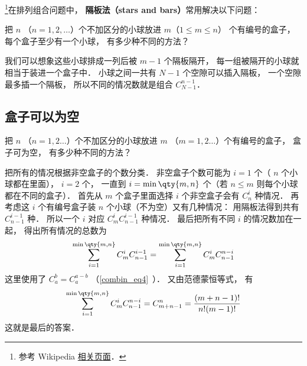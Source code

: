 

\footnote{参考 Wikipedia \href{https://en.wikipedia.org/wiki/Stars_and_bars_(combinatorics)}{相关页面}．}在排列组合问题中， \textbf{隔板法（stars and bars）}常用解决以下问题：

\begin{example}{}
把 $n$ （$n = 1,2,\dots$）个不加区分的小球放进 $m$（$1\leqslant m\leqslant n$） 个有编号的盒子， 每个盒子至少有一个小球， 有多少种不同的方法？
\end{example}

我们可以想象这些小球排成一列后被 $m-1$ 个隔板隔开， 每一组被隔开的小球就相当于装进一个盒子中． 小球之间一共有 $N-1$ 个空隙可以插入隔板， 一个空隙最多插一个隔板， 所以不同的情况数就是组合 $C_{N-1}^{n-1}$．

\subsection{盒子可以为空}

\begin{example}{}
把 $n$ （$n=1,2\dots$）个不加区分的小球放进 $m$ （$m=1,2\dots$）个有编号的盒子， 盒子可为空， 有多少种不同的方法？
\end{example}

把所有的情况根据非空盒子的个数分类． 非空盒子个数可能为 $i=1$ 个（ $n$ 个小球都在里面）， $i=2$ 个， 一直到 $i=\min\qty{m,n}$ 个（若 $n\leqslant m$ 则每个小球都在不同的盒子）． 首先从 $m$ 个盒子里面选择 $i$ 个非空盒子会有 $C_n^i$ 种情况． 再考虑这 $i$ 个有编号盒子装 $n$ 个小球（不为空）又有几种情况： 用隔板法得到共有 $C_{n-1}^{i-1}$ 种． 所以一个 $i$ 对应 $C_m^i C_{n-1}^{i-1}$ 种情况． 最后把所有不同 $i$ 的情况数加在一起， 得出所有情况的总数为
\begin{equation}
\sum_{i = 1}^{\min\qty{m,n}} C_m^i C_{n-1}^{i-1} = \sum_{i=1}^{\min\qty{m,n}}  C_m^i C_{n-1}^{n-i}
\end{equation}
这里使用了 $C_a^b = C_a^{a-b}$ （\autoref{combin_eq4}~）． 又由范德蒙恒等式， 有
\begin{equation}
\sum_{i=1}^{\min\qty{m,n}}  C_m^i C_{n-1}^{n-i} = C_{m+n-1}^n = \frac{(m+n-1)!}{n!(m - 1)!}
\end{equation}
这就是最后的答案．
